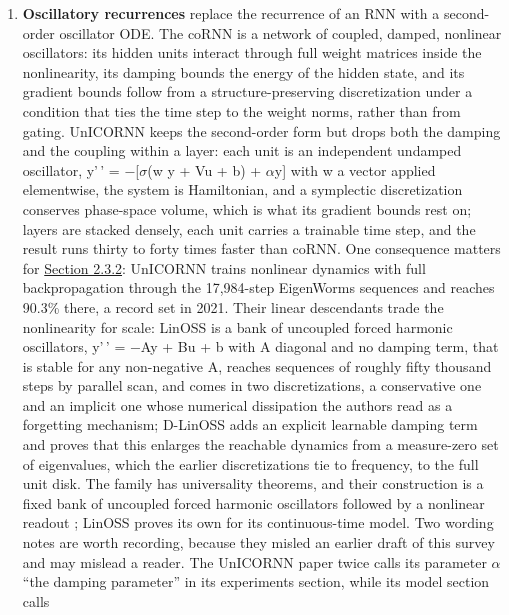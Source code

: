 \documentclass[a4paper,fleqn]{cas-sc}
\providecommand{\tightlist}{%
  \setlength{\itemsep}{0pt}\setlength{\parskip}{0pt}}
\begin{document}
\begin{enumerate}
\def\labelenumi{\arabic{enumi}.}
\tightlist
\item
  \textbf{Oscillatory recurrences} replace the recurrence of an RNN with
  a second-order oscillator ODE. The coRNN \citep{rusch2021} is a
  network of coupled, damped, nonlinear oscillators: its hidden units
  interact through full weight matrices inside the nonlinearity, its
  damping bounds the energy of the hidden state, and its gradient bounds
  follow from a structure-preserving discretization under a condition
  that ties the time step to the weight norms, rather than from gating.
  UnICORNN \citep{unicornn} keeps the second-order form but drops both
  the damping and the coupling within a layer: each unit is an
  independent undamped oscillator, y'\,' =
  \ensuremath{-}{[}\ensuremath{\sigma}(w y + Vu + b) +
  \ensuremath{\alpha}y{]} with w a vector applied elementwise, the
  system is Hamiltonian, and a symplectic discretization conserves
  phase-space volume, which is what its gradient bounds rest on; layers
  are stacked densely, each unit carries a trainable time step, and the
  result runs thirty to forty times faster than coRNN. One consequence
  matters for \hyperref[sec-2-3-2]{Section 2.3.2}: UnICORNN trains
  nonlinear dynamics with full backpropagation through the 17,984-step
  EigenWorms sequences and reaches 90.3\% there, a record set in 2021.
  Their linear descendants trade the nonlinearity for scale: LinOSS
  \citep{rusch2025} is a bank of uncoupled forced harmonic oscillators,
  y'\,' = \ensuremath{-}Ay + Bu + b with A diagonal and no damping term,
  that is stable for any non-negative A, reaches sequences of roughly
  fifty thousand steps by parallel scan, and comes in two
  discretizations, a conservative one and an implicit one whose
  numerical dissipation the authors read as a forgetting mechanism;
  D-LinOSS \citep{d-linoss} adds an explicit learnable damping term and
  proves that this enlarges the reachable dynamics from a measure-zero
  set of eigenvalues, which the earlier discretizations tie to
  frequency, to the full unit disk. The family has universality
  theorems, and their construction is a fixed bank of uncoupled forced
  harmonic oscillators followed by a nonlinear readout
  \citep{lanthaler2023}; LinOSS proves its own for its continuous-time
  model. Two wording notes are worth recording, because they misled an
  earlier draft of this survey and may mislead a reader. The UnICORNN
  paper twice calls its parameter \ensuremath{\alpha} ``the damping
  parameter'' in its experiments section, while its model section calls

\end{enumerate}
\end{document}

